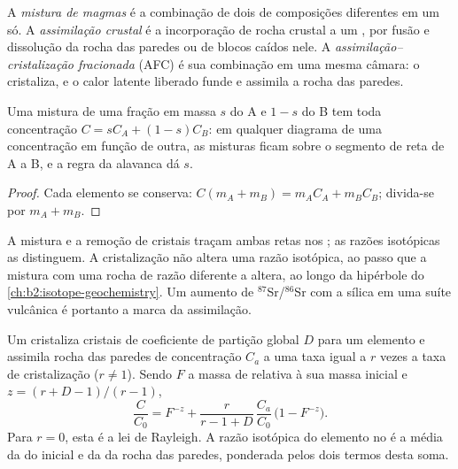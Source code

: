 \begin{definition}
\label{def:b2:magmatic-differentiation:open}
A \emph{mistura de magmas} é a combinação de dois  de composições
diferentes em um só. A \emph{assimilação crustal} é a
incorporação de rocha crustal a um , por fusão e dissolução da rocha das
paredes ou de blocos caídos nele. A \emph{assimilação--cristalização
fracionada} (AFC) é sua
combinação em uma mesma câmara: o  cristaliza, e o calor latente liberado
funde e assimila a rocha das paredes.
\end{definition}

\begin{proposition}\label{prop:b2:magmatic-differentiation:mixing}
Uma mistura de uma fração em massa $s$ do  A e $1-s$ do  B tem toda
concentração $C = sC_A + (1-s)C_B$: em qualquer diagrama de uma concentração em função de
outra, as misturas ficam sobre o segmento de reta de A a B, e a regra da alavanca dá
$s$.
\end{proposition}

\begin{proof}
Cada elemento se conserva: $C(m_A + m_B) = m_AC_A + m_BC_B$; divida-se por $m_A + m_B$.
\end{proof}

A mistura e a remoção de cristais traçam ambas retas nos ; as razões
isotópicas as distinguem. A cristalização não altera uma razão isotópica, ao passo que a
mistura com uma rocha de razão diferente a altera, ao longo da hipérbole do
\cref{ch:b2:isotope-geochemistry}. Um aumento de $^{87}$Sr/$^{86}$Sr com a sílica em uma
suíte vulcânica é portanto a marca da assimilação.

\begin{proposition}
\label{prop:b2:magmatic-differentiation:afc}
Um  cristaliza cristais de coeficiente de partição global $D$ para um elemento
e assimila rocha das paredes de concentração $C_a$ a uma taxa igual a $r$ vezes a taxa de
cristalização ($r \ne 1$). Sendo $F$ a massa de  relativa à sua massa
inicial e $z = (r + D - 1)/(r - 1)$,
\[
\frac{C}{C_0} = F^{-z} + \frac{r}{r - 1 + D}\,\frac{C_a}{C_0}\,\bigl(1 - F^{-z}\bigr).
\]
Para $r = 0$, esta é a lei de Rayleigh. A razão isotópica do elemento no 
é a média da do  inicial e da da rocha das paredes, ponderada pelos
dois termos desta soma.
\end{proposition}

